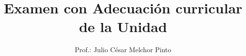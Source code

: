 \documentclass[12pt,addpoints]{evalua}
\title{Examen con Adecuación curricular\\ de la Unidad}
\author{Prof.: Julio César Melchor Pinto}
\begin{document}
\begin{questions}
    
\end{questions}
\end{document}
